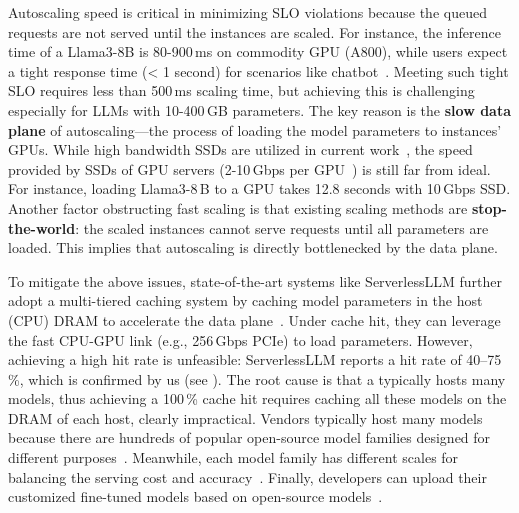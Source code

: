 Autoscaling speed is critical in minimizing SLO violations
because the queued requests are not served until the instances are scaled.
For instance, the inference time of a Llama3-8B is 80-900\,ms on commodity GPU (A800),
while users expect a tight response time (< 1 second) for scenarios like chatbot~\cite{latency-study,DBLP:conf/osdi/ZhongLCHZL0024,aws-latency}.
Meeting such tight SLO requires less than 500\,ms scaling time,
but achieving this is challenging especially for LLMs
with 10-400\,GB parameters.
The key reason is
the \textbf{slow data plane} of autoscaling---the process of loading the model parameters to instances' GPUs.
While high bandwidth SSDs
are utilized in current work~\cite{DBLP:journals/corr/abs-2401-14351},
the speed provided by SSDs of GPU servers (2-10\,Gbps per GPU~\cite{googleinstance,awsinstance,volcanoinstance})
is still far from ideal.
For instance, loading Llama3-8\,B to a GPU takes 12.8 seconds with 10\,Gbps SSD.
Another factor obstructing fast scaling is that existing scaling methods are
\textbf{stop-the-world}:
the scaled instances cannot serve requests until all parameters are loaded.
This implies that autoscaling is directly bottlenecked by the data plane.

To mitigate the above issues, state-of-the-art systems like ServerlessLLM
further adopt a multi-tiered caching system
by caching model parameters in the host (CPU) DRAM to accelerate the data plane~\cite{DBLP:conf/osdi/GujaratiKAHKVM20,DBLP:conf/eurosys/JeongBA23}.
Under cache hit, they can leverage the fast CPU-GPU link (e.g., 256\,Gbps PCIe) to load parameters.
However, achieving a high hit rate is unfeasible:
ServerlessLLM reports a hit rate of 40--75\,\%,
which is confirmed by us (see \textsection{\ref{sec:bg-motiv}}).
The root cause is that a {\maas} typically hosts many models,
thus achieving a 100\,\% cache hit requires caching all these models on the DRAM of each host,
clearly impractical.
Vendors typically host many models because
there are hundreds of popular open-source model families designed for different purposes~\cite{huggingface}.
Meanwhile,
each model family has different scales for balancing the serving cost and accuracy~\cite{qwens}.
Finally,
developers can upload their customized fine-tuned models based on open-source models~\cite{aws-serverless-llm}.

